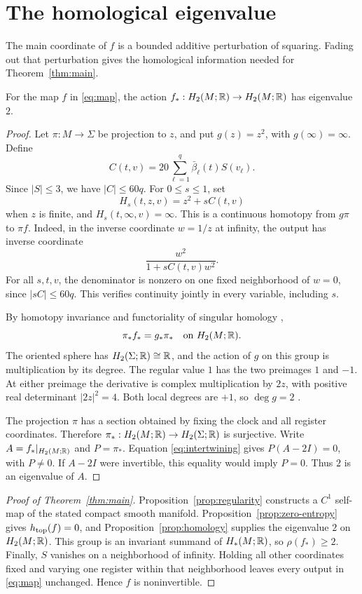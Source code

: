 \section{The homological eigenvalue}\label{sec:homology}

The main coordinate of \(f\) is a bounded additive perturbation of
squaring. Fading out that perturbation gives the homological information
needed for Theorem~\ref{thm:main}.

\begin{proposition}\label{prop:homology}
For the map \(f\) in \eqref{eq:map}, the action
\(f_*:H_2(M;\mathbb R)\to H_2(M;\mathbb R)\) has eigenvalue \(2\).
\end{proposition}

\begin{proof}
Let \(\pi:M\to\Sigma\) be projection to \(z\), and put \(g(z)=z^2\),
with \(g(\infty)=\infty\). Define
\[
 C(t,v)=20\sum_{\ell=1}^q\bar\beta_\ell(t)S(v_\ell).
\]
Since \(|S|\le3\), we have \(|C|\le60q\). For \(0\le s\le1\), set
\[
 H_s(t,z,v)=z^2+sC(t,v)
\]
when \(z\) is finite, and \(H_s(t,\infty,v)=\infty\).
This is a continuous homotopy from \(g\pi\) to \(\pi f\).
Indeed, in the inverse coordinate \(w=1/z\) at infinity, the output
has inverse coordinate
\[
 \frac{w^2}{1+sC(t,v)w^2}.
\]
For all \(s,t,v\), the denominator is nonzero on one fixed
neighborhood of \(w=0\), since \(|sC|\le60q\).
This verifies continuity jointly in every variable, including \(s\).

By homotopy invariance and functoriality of singular homology
\cite[Theorem~2.10]{Hatcher2002},
\begin{equation}\label{eq:intertwining}
 \pi_*f_*=g_*\pi_*
 \quad\text{on }H_2(M;\mathbb R).
\end{equation}
The oriented sphere has \(H_2(\Sigma;\mathbb R)\cong\mathbb R\), and the action
of \(g\) on this group is multiplication by its degree.
The regular value \(1\) has the two preimages \(1\) and \(-1\).
At either preimage the derivative is complex multiplication by
\(2z\), with positive real determinant \(|2z|^2=4\).
Both local degrees are \(+1\), so \(\deg g=2\)
\cite[Proposition~2.30 and Lemma~2.49]{Hatcher2002}.

The projection \(\pi\) has a section obtained by fixing the clock
and all register coordinates. Therefore
\(\pi_*:H_2(M;\mathbb R)\to H_2(\Sigma;\mathbb R)\) is surjective.
Write \(A=f_*|_{H_2(M;\mathbb R)}\) and \(P=\pi_*\). Equation
\eqref{eq:intertwining} gives \(P(A-2I)=0\), with \(P\ne0\).
If \(A-2I\) were invertible, this equality would imply \(P=0\).
Thus \(2\) is an eigenvalue of \(A\).
\end{proof}

\begin{proof}[Proof of Theorem~\ref{thm:main}]
Proposition~\ref{prop:regularity} constructs a \(C^1\) self-map of
the stated compact smooth manifold.
Proposition~\ref{prop:zero-entropy} gives \(h_{\mathrm{top}}(f)=0\), and
Proposition~\ref{prop:homology} supplies the eigenvalue \(2\) on
\(H_2(M;\mathbb R)\). This group is an invariant summand of \(H_*(M;\mathbb R)\),
so \(\rho(f_*)\ge2\). Finally, \(S\) vanishes on a neighborhood
of infinity. Holding all other coordinates fixed and varying
one register within that neighborhood leaves every output in
\eqref{eq:map} unchanged. Hence \(f\) is noninvertible.
\end{proof}

